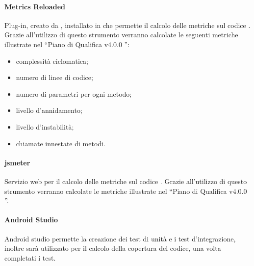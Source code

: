 \paragraph{Metrics Reloaded}
Plug-in, creato da , installato in  che permette il calcolo delle metriche sul codice . Grazie all'utilizzo di questo strumento verranno calcolate le seguenti metriche illustrate nel “Piano di Qualifica v4.0.0 ”:
\begin{itemize}
	\item complessità ciclomatica;
	\item numero di linee di codice;
	\item numero di parametri per ogni metodo;
	\item livello d'annidamento;
	\item livello d'instabilità;
	\item chiamate innestate di metodi.
\end{itemize}

\paragraph{jsmeter}
Servizio web per il calcolo delle metriche sul codice . Grazie all'utilizzo di questo strumento verranno calcolate le metriche illustrate nel “Piano di Qualifica v4.0.0 ”.

\paragraph{Android Studio}
Android studio permette la creazione dei test di unità e i test d'integrazione, inoltre sarà utilizzato per il calcolo della copertura del codice, una volta completati i test.

